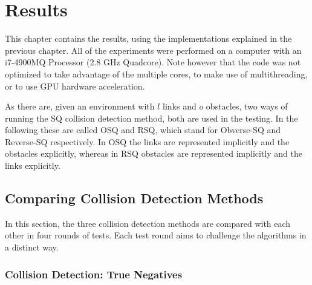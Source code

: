 \chapter{Results} \label{ch4:resu}

This chapter contains the results, using the implementations explained in the previous chapter. All of the experiments were performed on a computer with an i7-4900MQ Processor (2.8 GHz Quadcore). Note however that the code was not optimized to take advantage of the multiple cores, to make use of multithreading, or to use GPU hardware acceleration.

As there are, given an environment with $l$ links and $o$ obstacles, two ways of running the \gls{SQ} collision detection method, both are used in the testing. In the following these are called O\gls{SQ} and R\gls{SQ}, which stand for Obverse-\gls{SQ} and Reverse-\gls{SQ} respectively. In O\gls{SQ} the links are represented implicitly and the obstacles explicitly, whereas in R\gls{SQ} obstacles are represented implicitly and the links explicitly.

\section{Comparing Collision Detection Methods}

In this section, the three collision detection methods are compared with each other in four rounds of tests. Each test round aims to challenge the algorithms in a distinct way.

\subsection{Collision Detection: True Negatives} \label{subsec:Test1}

